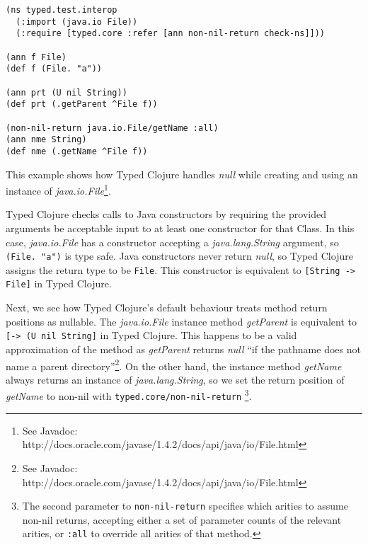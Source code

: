 \begin{lstlisting}[caption=Java interoperability with Typed Clojure]
(ns typed.test.interop
  (:import (java.io File))
  (:require [typed.core :refer [ann non-nil-return check-ns]]))

(ann f File)
(def f (File. "a"))

(ann prt (U nil String))
(def prt (.getParent ^File f))

(non-nil-return java.io.File/getName :all)
(ann nme String)
(def nme (.getName ^File f))

\end{lstlisting}

This example shows how Typed Clojure handles \emph{null} while creating and
using an instance of \emph{java.io.File}\footnote{See Javadoc: http://docs.oracle.com/javase/1.4.2/docs/api/java/io/File.html}.

Typed Clojure checks calls to Java constructors by requiring the provided
arguments be acceptable input to at least one constructor for that Class.
In this case, \emph{java.io.File} has a constructor accepting a \emph{java.lang.String}
argument, so \lstinline|(File. "a")| is type safe. Java constructors never
return \emph{null}, so Typed Clojure assigns the return type to be \lstinline|File|.
This constructor is equivalent to \lstinline|[String -> File]| in Typed Clojure.

Next, we see how Typed Clojure's default behaviour treats method return positions as nullable.
The \emph{java.io.File} instance method \emph{getParent}
is equivalent to \lstinline|[-> (U nil String]| in Typed Clojure. This happens to be
a valid approximation of the method as \emph{getParent} returns \emph{null} 
``if the pathname does not name a parent directory''\footnote{See Javadoc: http://docs.oracle.com/javase/1.4.2/docs/api/java/io/File.html}.
On the other hand, the instance method \emph{getName} always returns an
instance of \emph{java.lang.String}, so we set the return position of
\emph{getName} to non-nil with \lstinline|typed.core/non-nil-return|
\footnote{The second parameter to \lstinline|non-nil-return| specifies which arities to assume non-nil 
returns, accepting either a set of parameter counts of the relevant arities, or \lstinline|:all|
to override all arities of that method.}.
